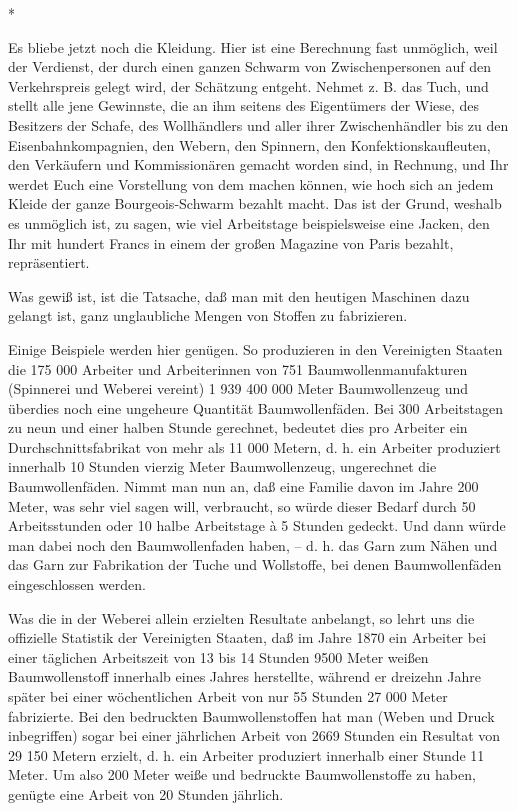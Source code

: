 \documentclass{scrbook}
\begin{document}
\begin{center}*\end{center}

Es bliebe jetzt noch die Kleidung. Hier ist eine Berechnung fast unmöglich, weil der Verdienst, der durch einen ganzen Schwarm von Zwischenpersonen auf den Verkehrspreis gelegt wird, der Schätzung entgeht. Nehmet z. B. das Tuch, und stellt alle jene Gewinnste, die an ihm seitens des Eigentümers der Wiese, des Besitzers der Schafe, des Wollhändlers und aller ihrer Zwischenhändler bis zu den Eisenbahnkompagnien, den Webern, den Spinnern, den Konfektionskaufleuten, den Verkäufern und Kommissionären gemacht worden sind, in Rechnung, und Ihr werdet Euch eine Vorstellung von dem machen können, wie hoch sich an jedem Kleide der ganze Bourgeois-Schwarm bezahlt macht. Das ist der Grund, weshalb es unmöglich ist, zu sagen, wie viel Arbeitstage beispielsweise eine Jacken, den Ihr mit hundert Francs in einem der großen Magazine von Paris bezahlt, repräsentiert.

Was gewiß ist, ist die Tatsache, daß man mit den heutigen Maschinen dazu gelangt ist, ganz unglaubliche Mengen von Stoffen zu fabrizieren.

Einige Beispiele werden hier genügen. So produzieren in den Vereinigten Staaten die 175 000 Arbeiter und Arbeiterinnen von 751 Baumwollenmanufakturen (Spinnerei und Weberei vereint) 1 939 400 000 Meter Baumwollenzeug und überdies noch eine ungeheure Quantität Baumwollenfäden. Bei 300 Arbeitstagen zu neun und einer halben Stunde gerechnet, bedeutet dies pro Arbeiter ein Durchschnittsfabrikat von mehr als 11 000 Metern, d. h. ein Arbeiter produziert innerhalb 10 Stunden vierzig Meter Baumwollenzeug, ungerechnet die Baumwollenfäden. Nimmt man nun an, daß eine Familie davon im Jahre 200 Meter, was sehr viel sagen will, verbraucht, so würde dieser Bedarf durch 50 Arbeitsstunden oder 10 halbe Arbeitstage à 5 Stunden gedeckt. Und dann würde man dabei noch den Baumwollenfaden haben, – d. h. das Garn zum Nähen und das Garn zur Fabrikation der Tuche und Wollstoffe, bei denen Baumwollenfäden eingeschlossen werden.

Was die in der Weberei allein erzielten Resultate anbelangt, so lehrt uns die offizielle Statistik der Vereinigten Staaten, daß im Jahre 1870 ein Arbeiter bei einer täglichen Arbeitszeit von 13 bis 14 Stunden 9500 Meter weißen Baumwollenstoff innerhalb eines Jahres herstellte, während er dreizehn Jahre später bei einer wöchentlichen Arbeit von nur 55 Stunden 27 000 Meter fabrizierte. Bei den bedruckten Baumwollenstoffen hat man (Weben und Druck inbegriffen) sogar bei einer jährlichen Arbeit von 2669 Stunden ein Resultat von 29 150 Metern erzielt, d. h. ein Arbeiter produziert innerhalb einer Stunde 11 Meter. Um also 200 Meter weiße und bedruckte Baumwollenstoffe zu haben, genügte eine Arbeit von 20 Stunden jährlich.
\end{document}
